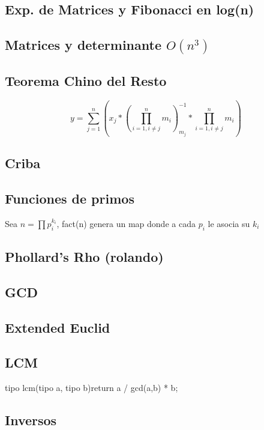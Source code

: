 \subsection{Exp. de Matrices y Fibonacci en log(n)}
\subsection{Matrices y determinante $O(n^3)$}
\subsection{Teorema Chino del Resto}
$$y=\sum_{j=1}^n (x_j*(\prod_{i=1, i\neq j}^n m_i)_{m_j}^{-1}*\prod_{i=1, i\neq j}^n m_i)$$
\subsection{Criba}
\subsection{Funciones de primos}
Sea $n=\prod{p_i^{k_i}}$, fact(n) genera un map donde a cada $p_i$ le asocia su $k_i$
\subsection{Phollard's Rho (rolando)}
\subsection{GCD}
\subsection{Extended Euclid}
\subsection{LCM}
\begin{code}
tipo lcm(tipo a, tipo b){return a / gcd(a,b) * b;}
\end{code}
\subsection{Inversos}
